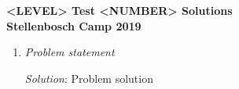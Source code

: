 \documentclass{article}
\begin{document}
\begin{center}
  \textbf{\Large <LEVEL> Test <NUMBER> Solutions}
  \\ \vspace{1em}
  \textbf{\large Stellenbosch Camp 2019}
\end{center}


\begin{enumerate}[1.]

\item %
\textit{Problem statement}

\textit{Solution}: Problem solution

\end{enumerate}
\end{document}
